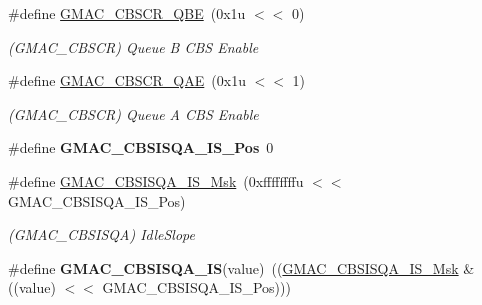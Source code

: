 \begin{DoxyCompactItemize}
\item 
\mbox{\label{group__SAME70__GMAC_gad2dc4c87a7cbd99e6abb3ab99da32845}} 
\#define \mbox{\hyperlink{group__SAME70__GMAC_gad2dc4c87a7cbd99e6abb3ab99da32845}{G\+M\+A\+C\+\_\+\+C\+B\+S\+C\+R\+\_\+\+Q\+BE}}~(0x1u $<$$<$ 0)
\begin{DoxyCompactList}\small\item\em (G\+M\+A\+C\+\_\+\+C\+B\+S\+CR) Queue B C\+BS Enable \end{DoxyCompactList}\item 
\mbox{\label{group__SAME70__GMAC_ga31e7409d229347876807aeb4e1f8f097}} 
\#define \mbox{\hyperlink{group__SAME70__GMAC_ga31e7409d229347876807aeb4e1f8f097}{G\+M\+A\+C\+\_\+\+C\+B\+S\+C\+R\+\_\+\+Q\+AE}}~(0x1u $<$$<$ 1)
\begin{DoxyCompactList}\small\item\em (G\+M\+A\+C\+\_\+\+C\+B\+S\+CR) Queue A C\+BS Enable \end{DoxyCompactList}\item 
\mbox{\label{group__SAME70__GMAC_ga121f19cf515c56db9197a9f36fe48ae8}} 
\#define {\bfseries G\+M\+A\+C\+\_\+\+C\+B\+S\+I\+S\+Q\+A\+\_\+\+I\+S\+\_\+\+Pos}~0
\item 
\mbox{\label{group__SAME70__GMAC_ga2f7f39464787c0436b82eb0befa6e690}} 
\#define \mbox{\hyperlink{group__SAME70__GMAC_ga2f7f39464787c0436b82eb0befa6e690}{G\+M\+A\+C\+\_\+\+C\+B\+S\+I\+S\+Q\+A\+\_\+\+I\+S\+\_\+\+Msk}}~(0xffffffffu $<$$<$ G\+M\+A\+C\+\_\+\+C\+B\+S\+I\+S\+Q\+A\+\_\+\+I\+S\+\_\+\+Pos)
\begin{DoxyCompactList}\small\item\em (G\+M\+A\+C\+\_\+\+C\+B\+S\+I\+S\+QA) Idle\+Slope \end{DoxyCompactList}\item 
\mbox{\label{group__SAME70__GMAC_ga508ac4b0b1ce55827d54ed3a825922c0}} 
\#define {\bfseries G\+M\+A\+C\+\_\+\+C\+B\+S\+I\+S\+Q\+A\+\_\+\+IS}(value)~((\mbox{\hyperlink{group__SAMV71__GMAC_ga2f7f39464787c0436b82eb0befa6e690}{G\+M\+A\+C\+\_\+\+C\+B\+S\+I\+S\+Q\+A\+\_\+\+I\+S\+\_\+\+Msk}} \& ((value) $<$$<$ G\+M\+A\+C\+\_\+\+C\+B\+S\+I\+S\+Q\+A\+\_\+\+I\+S\+\_\+\+Pos)))
\item 
\mbox{\label{group__SAME70__GMAC_gaa3940ed634fcc9e2e22557a9af7c54aa}} 

\end{DoxyCompactItemize}
